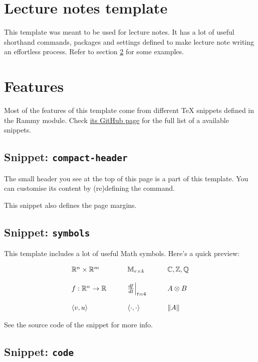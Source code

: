 \documentclass{article}
\begin{document}
\section{Lecture notes template}
This template was meant to be used for lecture notes. It has a lot of useful
shorthand commands, packages and settings defined to make lecture note writing
an effortless process. Refer to section \ref{sec:features} for some examples.


\section{Features}\label{sec:features}
Most of the features of this template come from different TeX snippets defined
in the  Rammy module. Check
\href{th://github.com/TimboKZ/latex-common}{its GitHub page} for the full list
of a available snippets.

\subsection{Snippet: \texttt{compact-header}}
The small header you see at the top of this page is a part of this template.
You can customise its content by (re)defining the  command.

This snippet also defines the page margins.


\subsection{Snippet: \texttt{symbols}}

This template includes a lot of useful Math symbols. Here's a quick preview:

\[
\begin{array}{lll}%
    \R^n \x \R^m & \qquad \M_{r \x k} \qquad & \C, \Z, \Q \\
    \\
    f: \R^n \ra \R & \qquad \frac{df}{dt}\evalat_{t=4} \qquad & A \tens B \\
    \\
    \inr{v, u} & \qquad \inner \qquad & \norm{A} \\
\end{array}
\]

See the source code of the  snippet for more info.


\subsection{Snippet: \texttt{code}}
\end{document}
